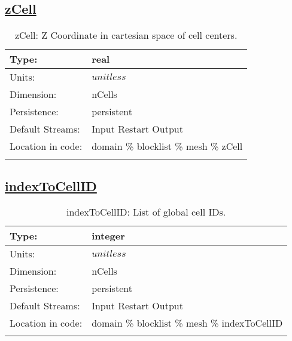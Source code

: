 \subsection[zCell]{\hyperref[sec:var_tab_mesh]{zCell}}
\label{subsec:var_sec_mesh_zCell}
\begin{center}
\begin{longtable}{| p{2.0in} | p{4.0in} |}
        \hline 
        Type: & real \\
        \hline 
        Units: & $unitless$ \\
        \hline 
        Dimension: & nCells \\
        \hline 
        Persistence: & persistent \\
        \hline 
		 Default Streams: & Input Restart Output  \\
        \hline 
		 Location in code: & domain \% blocklist \% mesh \% zCell \\
		 \hline 
    \caption{zCell: Z Coordinate in cartesian space of cell centers.}
\end{longtable}
\end{center}
\subsection[indexToCellID]{\hyperref[sec:var_tab_mesh]{indexToCellID}}
\label{subsec:var_sec_mesh_indexToCellID}
\begin{center}
\begin{longtable}{| p{2.0in} | p{4.0in} |}
        \hline 
        Type: & integer \\
        \hline 
        Units: & $unitless$ \\
        \hline 
        Dimension: & nCells \\
        \hline 
        Persistence: & persistent \\
        \hline 
		 Default Streams: & Input Restart Output  \\
        \hline 
		 Location in code: & domain \% blocklist \% mesh \% indexToCellID \\
		 \hline 
    \caption{indexToCellID: List of global cell IDs.}
\end{longtable}
\end{center}
